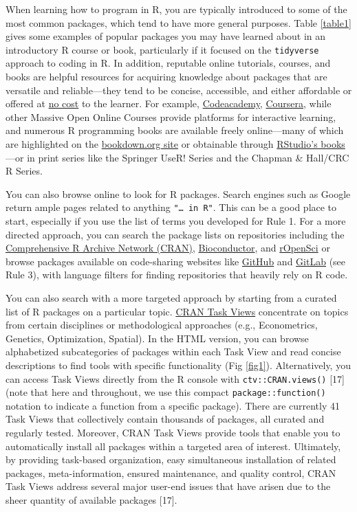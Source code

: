 \documentclass[10pt,letterpaper]{article}
\begin{document}
When learning how to program in R, you are typically introduced to some
of the most common packages, which tend to have more general purposes.
Table \ref{table1} gives some examples of popular packages you may have
learned about in an introductory R course or book, particularly if it
focused on the \texttt{tidyverse} approach to coding in R. In addition,
reputable online tutorials, courses, and books are helpful resources for
acquiring knowledge about packages that are versatile and
reliable---they tend to be concise, accessible, and either affordable or
offered at \href{https://committedtotape.shinyapps.io/freeR/}{no cost}
to the learner. For example,
\href{https://www.codecademy.com/learn/learn-r}{Codeacademy},
\href{https://www.coursera.org/learn/r-programming}{Coursera}, while
other Massive Open Online Courses provide platforms for interactive
learning, and numerous R programming books are available freely
online---many of which are highlighted on the
\href{https://bookdown.org/}{bookdown.org site} or obtainable through
\href{https://rstudio.com/resources/books/}{RStudio's books}---or in
print series like the Springer UseR! Series and the Chapman \& Hall/CRC
R Series.

You can also browse online to look for R packages. Search engines such
as Google return ample pages related to anything
\texttt{"\ldots{}\ in\ R"}. This can be a good place to start,
especially if you use the list of terms you developed for Rule 1. For a
more directed approach, you can search the package lists on repositories
including the \href{https://cran.r-project.org/}{Comprehensive R Archive
Network (CRAN)}, \href{https://www.bioconductor.org/}{Bioconductor}, and
\href{https://ropensci.org/}{rOpenSci} or browse packages available on
code-sharing websites like \href{https://github.com/}{GitHub} and
\href{https://about.gitlab.com/}{GitLab} (see Rule 3), with language
filters for finding repositories that heavily rely on R code.

You can also search with a more targeted approach by starting from a
curated list of R packages on a particular topic.
\href{https://cran.r-project.org/web/views/}{CRAN Task Views}
concentrate on topics from certain disciplines or methodological
approaches (e.g., Econometrics, Genetics, Optimization, Spatial). In the
HTML version, you can browse alphabetized subcategories of packages
within each Task View and read concise descriptions to find tools with
specific functionality (Fig \ref{fig1}). Alternatively, you can access
Task Views directly from the R console with \texttt{ctv::CRAN.views()}
{[}17{]} (note that here and throughout, we use this compact
\texttt{package::function()} notation to indicate a function from a
specific package). There are currently 41 Task Views that collectively
contain thousands of packages, all curated and regularly tested.
Moreover, CRAN Task Views provide tools that enable you to automatically
install all packages within a targeted area of interest. Ultimately, by
providing task-based organization, easy simultaneous installation of
related packages, meta-information, ensured maintenance, and quality
control, CRAN Task Views address several major user-end issues that have
arisen due to the sheer quantity of available packages {[}17{]}.
\end{document}
